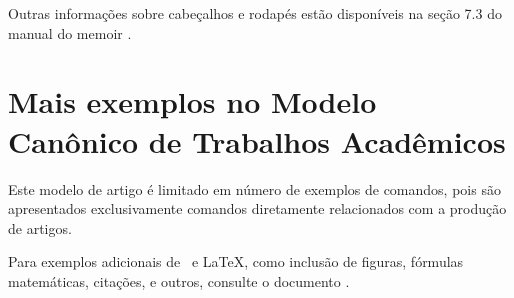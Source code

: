 Outras informações sobre cabeçalhos e rodapés estão disponíveis na seção 7.3 do
manual do \textsf{memoir} \cite{memoir}.

\section{Mais exemplos no Modelo Canônico de Trabalhos Acadêmicos}

Este modelo de artigo é limitado em número de exemplos de comandos, pois são
apresentados exclusivamente comandos diretamente relacionados com a produção de
artigos.

Para exemplos adicionais de \abnTeX\ e \LaTeX, como inclusão de figuras,
fórmulas matemáticas, citações, e outros, consulte o documento
.
